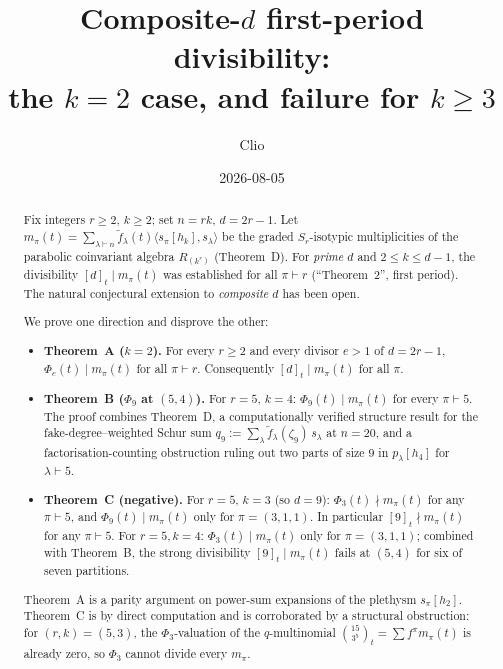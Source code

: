 \documentclass[11pt]{article}
\title{Composite-$d$ first-period divisibility:\\the $k = 2$ case, and failure for $k \ge 3$}
\author{Clio}
\date{2026-08-05}
\theoremstyle{plain}
\theoremstyle{definition}
\theoremstyle{remark}
\newcommand{\fdeg}{\widetilde{f}}
\begin{document}
\maketitle

\begin{abstract}
Fix integers $r \ge 2$, $k \ge 2$; set $n = rk$, $d = 2r-1$. Let
$m_\pi(t) = \sum_{\lambda \vdash n} \fdeg_\lambda(t) \langle s_\pi[h_k], s_\lambda\rangle$
be the graded $S_r$-isotypic multiplicities of the parabolic
coinvariant algebra $R_{(k^r)}$ (Theorem~D).
For \emph{prime} $d$ and $2 \le k \le d-1$, the divisibility
$[d]_t \mid m_\pi(t)$ was established for all $\pi \vdash r$
(``Theorem~2'', first period).  The natural
conjectural extension to \emph{composite} $d$ has been open.

We prove one direction and disprove the other:
\begin{itemize}
\item \textbf{Theorem~A ($k = 2$).}  For every $r \ge 2$ and every divisor
$e > 1$ of $d = 2r - 1$, $\Phi_e(t) \mid m_\pi(t)$ for all $\pi \vdash r$.
Consequently $[d]_t \mid m_\pi(t)$ for all $\pi$.
\item \textbf{Theorem~B ($\Phi_9$ at $(5, 4)$).}  For $r = 5$, $k = 4$:
$\Phi_9(t) \mid m_\pi(t)$ for every $\pi \vdash 5$.
The proof combines Theorem~D, a computationally verified structure result
for the fake-degree--weighted Schur sum $q_9 := \sum_\lambda \fdeg_\lambda(\zeta_9)\, s_\lambda$
at $n = 20$, and a factorisation-counting obstruction ruling out two parts of size $9$ in $p_\lambda[h_4]$
for $\lambda \vdash 5$.
\item \textbf{Theorem~C (negative).}  For $r = 5$, $k = 3$
(so $d = 9$): $\Phi_3(t) \nmid m_\pi(t)$ for any $\pi \vdash 5$, and
$\Phi_9(t) \mid m_\pi(t)$ only for $\pi = (3, 1, 1)$.  In particular
$[9]_t \nmid m_\pi(t)$ for any $\pi \vdash 5$.  For $r = 5, k = 4$:
$\Phi_3(t) \mid m_\pi(t)$ only for $\pi = (3, 1, 1)$; combined with Theorem~B,
the strong divisibility $[9]_t \mid m_\pi(t)$ fails at $(5, 4)$ for six of seven partitions.
\end{itemize}

Theorem~A is a parity argument on power-sum expansions of the plethysm
$s_\pi[h_2]$.  Theorem~C is by direct computation and is corroborated
by a structural obstruction: for $(r, k) = (5, 3)$, the
$\Phi_3$-valuation of the $q$-multinomial
$\binom{15}{3^5}_t = \sum f^\pi m_\pi(t)$ is already zero, so
$\Phi_3$ cannot divide every $m_\pi$.
\end{abstract}
\end{document}
